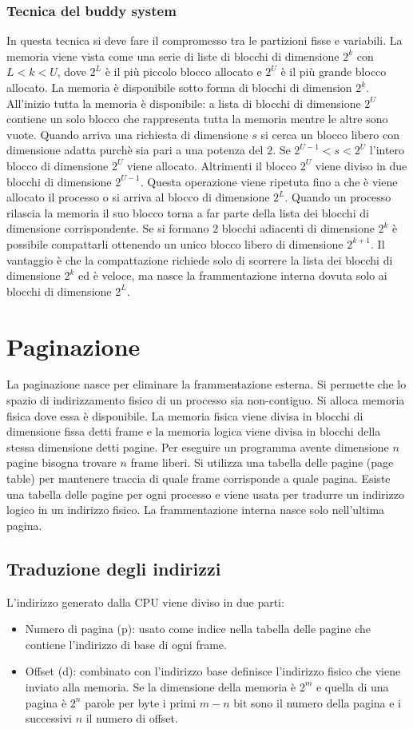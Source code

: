 \subsubsection{Tecnica del buddy system}
In questa tecnica si deve fare il compromesso tra le partizioni fisse e variabili. La memoria viene vista come una serie di liste di blocchi di dimensione $2^k$ con $L < k < U$, dove
$2^L$ \`e il pi\`u piccolo blocco allocato e $2^U$ \`e il pi\`u grande blocco allocato. La memoria \`e disponibile sotto forma di blocchi di dimension $2^k$. All'inizio tutta la memoria
\`e disponibile: a lista di blocchi di dimensione $2^U$ contiene un solo blocco che rappresenta tutta la memoria mentre le altre sono vuote. Quando arriva una richiesta di dimensione $s$
si cerca un blocco libero con dimensione adatta purch\`e sia pari a una potenza del $2$. Se $2^{U-1} < s < 2^U$ l'intero blocco di dimensione $2^U$ viene allocato. Altrimenti il blocco 
$2^U$ viene diviso in due blocchi di dimensione $2^{U-1}$. Questa operazione viene ripetuta fino a che \`e viene allocato il processo o si arriva al blocco di dimensione $2^L$. Quando
un processo rilascia la memoria il suo blocco torna a far parte della lista dei blocchi di dimensione corrispondente. Se si formano $2$ blocchi adiacenti di dimensione $2^k$ \`e 
possibile compattarli ottenendo un unico blocco libero di dimensione $2^{k+1}$. Il vantaggio \`e che la compattazione richiede solo di scorrere la lista dei blocchi di dimensione $2^k$
ed \`e veloce, ma nasce la frammentazione interna dovuta solo ai blocchi di dimensione $2^L$. 
\section{Paginazione}
La paginazione nasce per eliminare la frammentazione esterna. Si permette che lo spazio di indirizzamento fisico di un processo sia non-contiguo. Si alloca memoria fisica dove essa \`e
disponibile. La memoria fisica viene divisa in blocchi di dimensione fissa detti frame e la memoria logica viene divisa in blocchi della stessa dimensione detti pagine. Per eseguire
un programma avente dimensione $n$ pagine bisogna trovare $n$ frame liberi. Si utilizza una tabella delle pagine (page table) per mantenere traccia di quale frame corrisponde a quale
pagina. Esiste una tabella delle pagine per ogni processo e viene usata per tradurre un indirizzo logico in un indirizzo fisico. La frammentazione interna nasce solo nell'ultima pagina. 
\subsection{Traduzione degli indirizzi}
L'indirizzo generato dalla CPU viene diviso in due parti: 
\begin{itemize}
	\item Numero di pagina (p): usato come indice nella tabella delle pagine che contiene l'indirizzo di base di ogni frame. 
	\item Offset (d): combinato con l'indirizzo base definisce l'indirizzo fisico che viene inviato alla memoria. Se la dimensione della memoria \`e $2^m$ e quella di una pagina \`e
		$2^n$ parole per byte i primi $m-n$ bit sono il numero della pagina e i successivi $n$ il numero di offset. 
\end{itemize}

